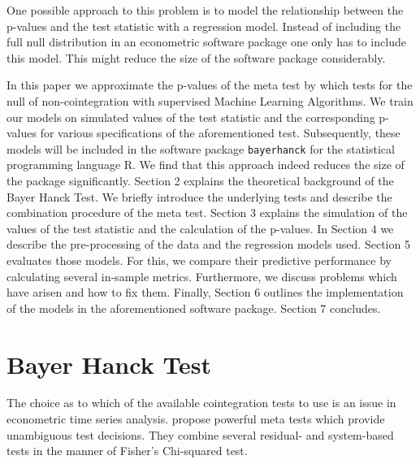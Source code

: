 \documentclass[12pt,a4paper]{article}
\begin{document}
One possible approach to this problem is to model the relationship
between the p-values and the test statistic with a regression model.
Instead of including the full null distribution in an econometric
software package one only has to include this model. This might reduce
the size of the software package considerably.

In this paper we approximate the p-values of the meta test by
\textcite{Bayerhanck_2012} which tests for the null of non-cointegration
with supervised Machine Learning Algorithms. We train our models on
simulated values of the test statistic and the corresponding p-values
for various specifications of the aforementioned test. Subsequently,
these models will be included in the software package
\texttt{bayerhanck} for the statistical programming language R. We find
that this approach indeed reduces the size of the package significantly.
Section 2 explains the theoretical background of the Bayer Hanck Test.
We briefly introduce the underlying tests and describe the combination
procedure of the meta test. Section 3 explains the simulation of the
values of the test statistic and the calculation of the p-values. In
Section 4 we describe the pre-processing of the data and the regression
models used. Section 5 evaluates those models. For this, we compare
their predictive performance by calculating several in-sample metrics.
Furthermore, we discuss problems which have arisen and how to fix them.
Finally, Section 6 outlines the implementation of the models in the
aforementioned software package. Section 7 concludes.

\hypertarget{bayer-hanck-test}{%
\section{Bayer Hanck Test}\label{bayer-hanck-test}}

The choice as to which of the available cointegration tests to use is an
issue in econometric time series analysis. \textcite{Bayerhanck_2012}
propose powerful meta tests which provide unambiguous test decisions.
They combine several residual- and system-based tests in the manner of
Fisher's \autocite*{Fisher_1932} Chi-squared test.
\end{document}
